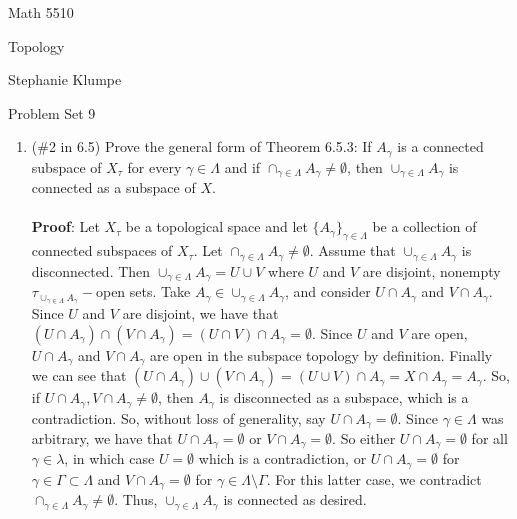 \documentclass[12pt]{article}
\begin{document}
\noindent Math 5510

\noindent Topology

\noindent Stephanie Klumpe

\vspace{.2in}
\begin{center}
Problem Set 9
\end{center}

 \begin{enumerate}%
 \item (\#2 in 6.5) Prove the general form of Theorem 6.5.3: If $A_{\gamma}$ is a connected subspace of $X_{\tau}$ for every $\gamma\in \Lambda$ and if $\cap_{\gamma\in\Lambda} A_{\gamma}\neq \emptyset$, then $\cup_{\gamma\in\Lambda}A_\gamma$ is connected as a subspace of $X$.\\\\

\textbf{Proof}: Let $X_{\tau}$ be a topological space and let $\{A_{\gamma}\}_{\gamma\in\Lambda}$ be a collection of connected subspaces of $X_{\tau}$. Let $\cap_{\gamma\in\Lambda}A_{\gamma}\neq\emptyset$. Assume that $\cup_{\gamma\in\Lambda} A_{\gamma}$ is disconnected. Then $\cup_{\gamma\in\Lambda}A_{\gamma}=U\cup V$ where $U$ and $V$ are disjoint, nonempty $\tau_{\cup_{\gamma\in\Lambda} A_{\gamma}}-$open sets. Take $A_{\gamma}\in\cup_{\gamma\in\Lambda} A_{\gamma}$, and consider $U\cap A_{\gamma}$ and $V\cap A_{\gamma}$. Since $U$ and $V$ are disjoint, we have that $(U\cap A_{\gamma})\cap(V\cap A_{\gamma})=(U\cap V)\cap A_{\gamma}=\emptyset$. Since $U$ and $V$ are open, $U\cap A_{\gamma}$ and $V\cap A_{\gamma}$ are open in the subspace topology by definition. Finally we can see that $(U\cap A_{\gamma})\cup(V\cap A_{\gamma})=(U\cup V)\cap A_{\gamma}=X\cap A_{\gamma}=A_{\gamma}$. So, if $U\cap A_{\gamma}, V\cap A_{\gamma}\neq\emptyset$, then $A_{\gamma}$ is disconnected as a subspace, which is a contradiction. So, without loss of generality, say $U\cap A_{\gamma}=\emptyset$. Since $\gamma\in\Lambda$ was arbitrary, we have that $U\cap A_{\gamma}=\emptyset$ or $V\cap A_{\gamma}=\emptyset$. So either $U\cap A_{\gamma}=\emptyset$ for all $\gamma\in\lambda$, in which case $U=\emptyset$ which is a contradiction, or $U\cap A_{\gamma}=\emptyset$ for $\gamma\in\Gamma\subset\Lambda$ and $V\cap A_{\gamma}=\emptyset$ for $\gamma\in\Lambda\setminus\Gamma$. For this latter case, we contradict $\cap_{\gamma\in\Lambda} A_{\gamma}\neq \emptyset$. Thus, $\cup_{\gamma\in\Lambda} A_{\gamma}$ is connected as desired.\\[20pt]


\end{enumerate}
\end{document}
